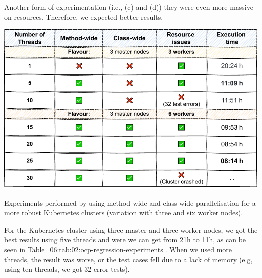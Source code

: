 Another form of experimentation (i.e., (c) and (d)) they were even more massive on resources.
Therefore, we expected better results.
\begin{table}[ht!]
    \centering
    \includegraphics[scale=0.8]{obrazky-figures/08-experiments/regression/06-exp-ocp-regression}
    \caption{Experiments performed by using method-wide and class-wide parallelisation for a more robust Kubernetes
    clusters (variation with three and six worker nodes).}
    \label{06:tab:02:ocp-regression-experiments}
\end{table}
For the Kubernetes cluster using three master and three worker nodes, we got the best results using five threads and were
we can get from 21h to 11h, as can be seen in Table~\ref{06:tab:02:ocp-regression-experiments}.
When we used more threads, the result was worse, or the test cases fell due to a lack of memory (e.g, using
ten threads, we got 32 error tests).

